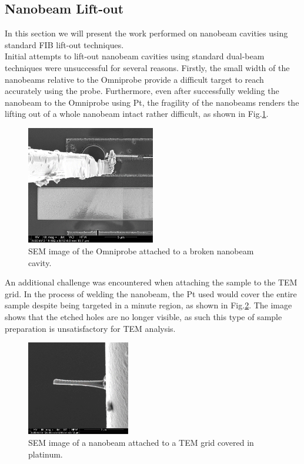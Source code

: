 \subsection{Nanobeam Lift-out}
In this section we will present the work performed on nanobeam cavities using standard FIB lift-out techniques.\\
Initial attempts to lift-out nanobeam cavities using standard dual-beam techniques were unsuccessful for several reasons. Firstly, the small width of the nanobeams relative to the Omniprobe provide a difficult target to reach accurately using the probe. Furthermore, even after successfully welding the nanobeam to the Omniprobe using Pt, the fragility of the nanobeams renders the lifting out of a whole nanobeam intact rather difficult, as shown in Fig.\ref{brokennb}.

\begin{figure}[h]
	\centering
	\includegraphics[width=0.5\textwidth]{Figs/Ch5/brokennb.png}
	\caption {SEM image of the Omniprobe attached to a broken nanobeam cavity.}
	\label{brokennb}
\end{figure}
\FloatBarrier 

An additional challenge was encountered when attaching the sample to the TEM grid. In the process of welding the nanobeam, the Pt used would cover the entire sample despite being targeted in a minute region, as shown in Fig.\ref{nbcovered}. The image shows that the etched holes are no longer visible, as such this type of sample preparation is unsatisfactory for TEM analysis.

\begin{figure}[h]
	\centering
	\includegraphics[width=0.4\textwidth]{Figs/Ch5/nbcovered.png}
	\caption {SEM image of a nanobeam attached to a TEM grid covered in platinum.}
	\label{nbcovered}
\end{figure}
\FloatBarrier 

